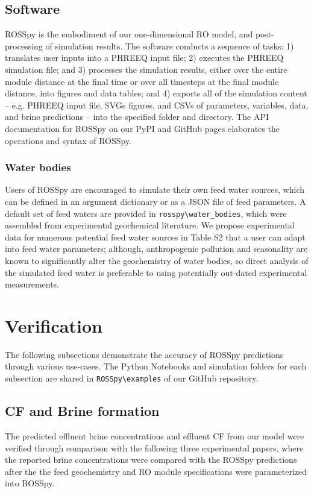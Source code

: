 \documentclass[journal=ACSES&TWater,manuscript=article]{achemso}
\begin{document}
\subsection{Software}
ROSSpy is the embodiment of our one-dimensional RO model, and post-processing of simulation results. The software conducts a sequence of tasks: 1) translates user inputs into a PHREEQ input file; 2) executes the PHREEQ simulation file; and 3) processes the simulation results, either over the entire module distance at the final time or over all timesteps at the final module distance, into figures and data tables; and 4) exports all of the simulation content -- e.g. PHREEQ input file, SVGs figures, and CSVs of parameters, variables, data, and brine predictions -- into the specified folder and directory. The API documentation for ROSSpy on our PyPI and GitHub pages elaborates the operations and syntax of ROSSpy.


\subsubsection{Water bodies}
Users of ROSSpy are encouraged to simulate their own feed water sources, which can be defined in an argument dictionary or as a JSON file of feed parameters. A default set of feed waters are provided in \verb|rosspy\water_bodies|, which were assembled from experimental geochemical literature. We propose experimental data for numerous potential feed water sources in Table S2 that a user can adapt into feed water parameters; although, anthropogenic pollution \cite{Chen2008SourcesSea} and seasonality \cite{Sarthou2001SeasonalSea} are known to significantly alter the geochemistry of water bodies, so direct analysis of the simulated feed water is preferable to using potentially out-dated experimental measurements. 


\section{Verification}
The following subsections demonstrate the accuracy of ROSSpy predictions through various use-cases. The Python Notebooks and simulation folders for each subsection are shared in \verb|ROSSpy\examples| of our GitHub repository.


\subsection{CF and Brine formation}
The predicted effluent brine concentrations and effluent CF from our model were verified through comparison with the following three experimental papers, where the reported brine concentrations were compared with the ROSSpy predictions after the the feed geochemistry and RO module specifications were parameterized into ROSSpy. 
\end{document}
